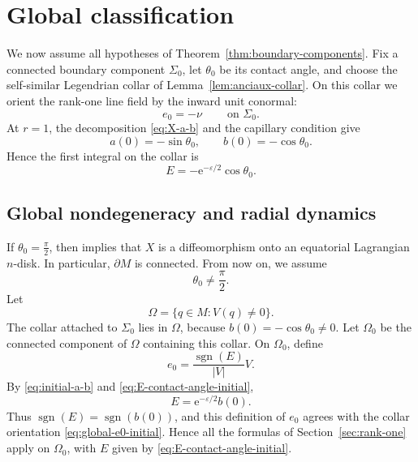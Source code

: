 \documentclass[11pt,a4paper]{article}
\numberwithin{equation}{section}
\newcommand{\ee}{\mathrm e}
\begin{document}
\section{Global classification}\label{sec:global-classification}

We now assume all hypotheses of Theorem~\ref{thm:boundary-components}.  Fix a connected boundary component $\Sigma_0$, let $\theta_0$ be its contact angle, and choose the self-similar Legendrian collar of Lemma~\ref{lem:anciaux-collar}.  On this collar we orient the rank-one line field by the inward unit conormal:
\begin{equation}\label{eq:global-e0-initial}
        e_0=-\nu
        \qquad\ \text{on }\Sigma_0.
\end{equation}
At $r=1$, the decomposition \eqref{eq:X-a-b} and the capillary condition give
\begin{equation}\label{eq:initial-a-b}
        a(0)=-\sin\theta_0,
        \qquad
        b(0)=-\cos\theta_0.
\end{equation}
Hence the first integral on the collar is
\begin{equation}\label{eq:E-contact-angle-initial}
        E=-\ee^{-\varepsilon/2}\cos\theta_0.
\end{equation}

\subsection{Global nondegeneracy and radial dynamics}
If $\theta_0=\frac{\pi}{2}$, then
\cite[Theorem~1.3]{GaoMaYao2026} implies that $X$ is a
diffeomorphism onto an equatorial Lagrangian $n$-disk. In particular,
$\partial M$ is connected. From now on, we assume
\begin{equation}\label{eq:nonfree-assumption}
\theta_0\neq\frac{\pi}{2}.
\end{equation}
Let
$$
        \Omega=\{q\in M:V(q)\ne0\}.
$$
The collar attached to $\Sigma_0$ lies in $\Omega$, because $b(0)=-\cos\theta_0\ne0$.  Let $\Omega_0$ be the connected component of $\Omega$ containing this collar.  On $\Omega_0$, 
define
\[
        e_0=\frac{\operatorname{sgn}(E)}{|V|}V.
\]
By \eqref{eq:initial-a-b} and \eqref{eq:E-contact-angle-initial},
\[
E=\ee^{-\varepsilon/2}b(0).
\]
Thus $\operatorname{sgn}(E)=\operatorname{sgn}(b(0))$, and this definition of $e_0$ agrees with the collar orientation \eqref{eq:global-e0-initial}. Hence all the formulas of Section~\ref{sec:rank-one} apply on $\Omega_0$, with $E$ given by  \eqref{eq:E-contact-angle-initial}.
\end{document}
